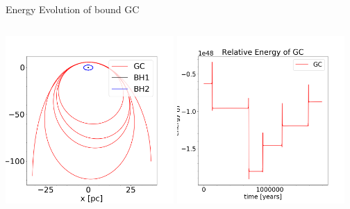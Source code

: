 \documentclass[aspectratio=169]{beamer}
\begin{document}
\begin{frame}
  {Energy Evolution of bound GC}
  \begin{columns}
    \includegraphics[width=6.4cm, height=6.4cm]{./Images/bound_track.png}
    \includegraphics[width=6.4cm, height=6.4cm]{./Images/bound_energy.png}
  \end{columns}
\end{frame}
\end{document}
